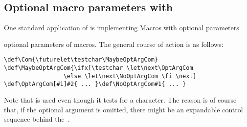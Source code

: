 \documentclass[letterpaper]{book}
\begin{document}
\subsection{Optional macro parameters with \protect{}}

One standard application of  is implementing
\howto Macros with optional parameters\par
optional parameters of macros. The general course of action
is as follows:
\begin{verbatim}
\def\Com{\futurelet\testchar\MaybeOptArgCom}
\def\MaybeOptArgCom{\ifx[\testchar \let\next\OptArgCom 
                 \else \let\next\NoOptArgCom \fi \next}
\def\OptArgCom[#1]#2{ ... }\def\NoOptArgCom#1{ ... }
\end{verbatim}
Note that  is used even though it tests
for a character. The reason is of course that,
if the optional argument is omitted, there might be an
expandable control sequence behind the~.
\end{document}
